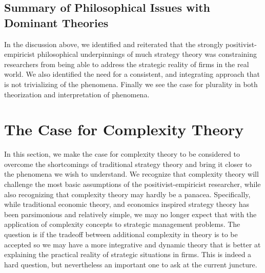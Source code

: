 \documentclass[12pt,letterpaper]{article}
\begin{document}
\subsection{Summary of Philosophical Issues with Dominant Theories}
In the discussion above, we identified and reiterated that the strongly positivist-empiricist philosophical underpinnings of much strategy theory was constraining researchers from being able to address the strategic reality of firms in the real world. We also identified the need for a consistent, and integrating approach that is not trivializing of the phenomena. Finally we see the case for plurality in both theorization and interpretation of phenomena.

\section{The Case for Complexity Theory}\label{S:ComplexityTheory}
In this section, we make the case for complexity theory to be considered to overcome the shortcomings of traditional strategy theory and bring it closer to the phenomena we wish to understand. We recognize that  complexity theory will challenge the most basic assumptions of the positivist-empiricist researcher, while also recognizing that complexity theory may hardly be a panacea. Specifically, while traditional economic theory, and economics inspired strategy theory has been parsimonious and relatively simple, we may no longer expect that with the application of complexity concepts to strategic management problems. The question is if the tradeoff between additional complexity in theory is to be accepted so we may have a more integrative and dynamic theory that is better at explaining the practical reality of strategic situations in firms. This is indeed a hard question, but nevertheless an important one to ask at the current juncture. 
\end{document}
